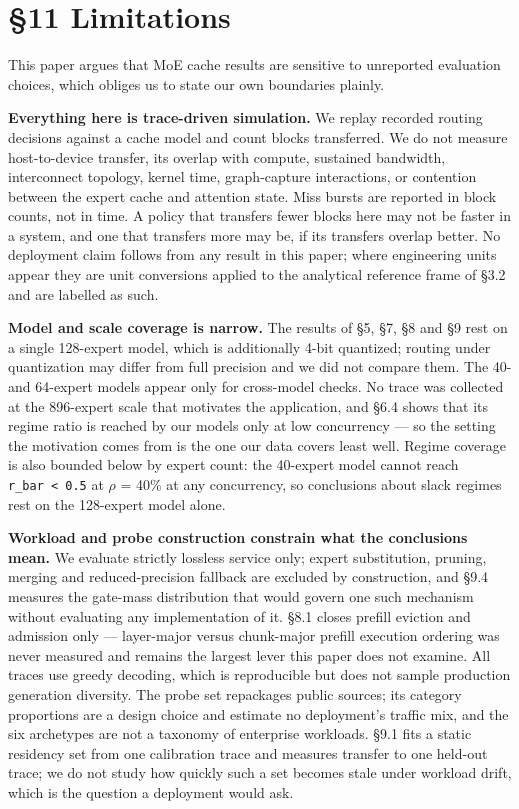 \documentclass[
  10pt,
  letterpaper,
  10pt]{article}
\begin{document}
\section{§11 Limitations}\label{limitations}

This paper argues that MoE cache results are sensitive to unreported
evaluation choices, which obliges us to state our own boundaries
plainly.

\textbf{Everything here is trace-driven simulation.} We replay recorded
routing decisions against a cache model and count blocks transferred. We
do not measure host-to-device transfer, its overlap with compute,
sustained bandwidth, interconnect topology, kernel time, graph-capture
interactions, or contention between the expert cache and attention
state. Miss bursts are reported in block counts, not in time. A policy
that transfers fewer blocks here may not be faster in a system, and one
that transfers more may be, if its transfers overlap better. No
deployment claim follows from any result in this paper; where
engineering units appear they are unit conversions applied to the
analytical reference frame of §3.2 and are labelled as such.

\textbf{Model and scale coverage is narrow.} The results of §5, §7, §8
and §9 rest on a single 128-expert model, which is additionally 4-bit
quantized; routing under quantization may differ from full precision and
we did not compare them. The 40- and 64-expert models appear only for
cross-model checks. No trace was collected at the 896-expert scale that
motivates the application, and §6.4 shows that its regime ratio is
reached by our models only at low concurrency --- so the setting the
motivation comes from is the one our data covers least well. Regime
coverage is also bounded below by expert count: the 40-expert model
cannot reach \texttt{r\_bar\ \textless{}\ 0.5} at \ensuremath{\rho} =
40\% at any concurrency, so conclusions about slack regimes rest on the
128-expert model alone.

\textbf{Workload and probe construction constrain what the conclusions
mean.} We evaluate strictly lossless service only; expert substitution,
pruning, merging and reduced-precision fallback are excluded by
construction, and §9.4 measures the gate-mass distribution that would
govern one such mechanism without evaluating any implementation of it.
§8.1 closes prefill eviction and admission only --- layer-major versus
chunk-major prefill execution ordering was never measured and remains
the largest lever this paper does not examine. All traces use greedy
decoding, which is reproducible but does not sample production
generation diversity. The probe set repackages public sources; its
category proportions are a design choice and estimate no deployment's
traffic mix, and the six archetypes are not a taxonomy of enterprise
workloads. §9.1 fits a static residency set from one calibration trace
and measures transfer to one held-out trace; we do not study how quickly
such a set becomes stale under workload drift, which is the question a
deployment would ask.
\end{document}
